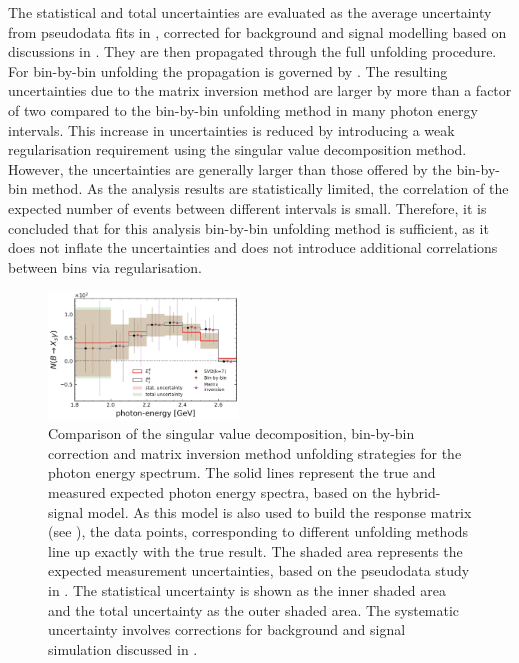 The statistical and total uncertainties are evaluated as the average uncertainty from pseudodata fits in , corrected for background and signal modelling based on discussions in .
They are then propagated through the full unfolding procedure.
For bin-by-bin unfolding the propagation is governed by .
The resulting uncertainties due to the matrix inversion method are larger by more than a factor of two compared to the bin-by-bin unfolding method in many photon energy intervals.
This increase in uncertainties is reduced by introducing a weak regularisation requirement using the singular value decomposition method.
However, the uncertainties are generally larger than those offered by the bin-by-bin method.
As the analysis results are statistically limited, the correlation of the expected number of events between different \EB intervals is small.
Therefore, it is concluded that for this analysis bin-by-bin unfolding method is sufficient, as it does not inflate the uncertainties and does not introduce additional correlations between bins via regularisation.

\begin{figure}[htbp!]
    \centering
    \includegraphics[width=0.45\textwidth]{figures/signal_validation/bin_by_bin_svd_comparison_cov_mtx.pdf}
    \caption{\label{fig:unfolding_comparison}
    Comparison of the singular value decomposition, bin-by-bin correction and matrix inversion method unfolding strategies
    for the photon energy spectrum.
    The solid lines represent the true and measured expected photon energy spectra, based on the hybrid-signal model.
    As this model is also used to build the response matrix (see ), the data points, corresponding to different unfolding methods 
    line up exactly with the true result.
    The shaded area represents the expected measurement uncertainties, based on the pseudodata study in .
    The statistical uncertainty is shown as the inner shaded area and the total uncertainty as the outer shaded area.
    The systematic uncertainty involves corrections for background and signal simulation discussed in .
    }
\end{figure}

